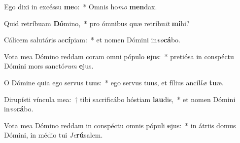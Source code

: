 \item Ego dixi in excéssu \textbf{me}o:~* Omnis ho\textit{mo} \textbf{men}dax.
\item Quid retríbuam \textbf{Dó}mino,~* pro ómnibus quæ retríbu\tinyhspace\textit{it} \textbf{mi}hi?
\item Cálicem salutáris ac\textbf{cí}piam:~* et nomen Dómini in\textit{vo}\textbf{cá}bo.
\item Vota mea Dómino reddam coram omni pópulo \textbf{e}jus:~* pretiósa in conspéctu Dómini mors sanctó\textit{rum} \textbf{e}jus.
\item O Dómine quia ego servus \textbf{tu}us:~* ego servus tuus, et fílius ancíl\textit{læ} \textbf{tu}æ.
\item Dirupísti víncula mea:~† tibi sacrificábo hóstiam \textbf{lau}dis,~* et nomen Dómini in\textit{vo}\textbf{cá}bo.
\item Vota mea Dómino reddam in conspéctu omnis pópuli \textbf{e}jus:~* in átriis domus Dómini, in médio tui \tinyhspace\textit{Je}\textbf{rú}salem.
